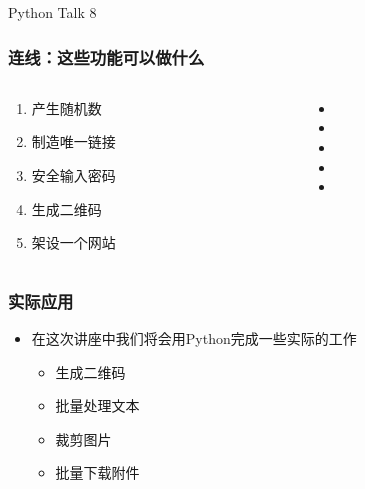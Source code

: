 



\PreFirstFrame
\begin{frame} [fragile]
	\centerline{\fontsize{42}{42}\selectfont Python Talk 8}
\end{frame}
\PostFirstFrame

\begin{frame} [fragile]
	\frametitle{连线：这些功能可以做什么}
	\linespread{1.5}
	\begin{columns}[T]
		\begin{column}[T]{.5\textwidth}
			\begin{enumerate}
			\item 产生随机数
			\item 制造唯一链接
			\item 安全输入密码
			\item 生成二维码
			\item 架设一个网站
			\end{enumerate}
		\end{column}
		\begin{column}[T]{.5\textwidth}
			\begin{itemize}
			\item {}
			\item {}
			\item {}
			\item {}
			\item {}
			\end{itemize}
		\end{column}
	\end{columns}
\end{frame}

\begin{frame} [fragile]
	\frametitle{实际应用}
	\linespread{1.5}
	\begin{itemize}
	\item 在这次讲座中我们将会用Python完成一些实际的工作
		\begin{itemize}
		\item 生成二维码
		\item 批量处理文本
		\item 裁剪图片
		\item 批量下载附件
		\end{itemize}
	\end{itemize}
\end{frame}

